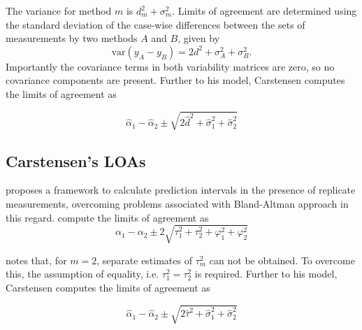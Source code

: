 \documentclass[12pt, a4paper]{report}
\theoremstyle{plain}
\theoremstyle{definition}
\theoremstyle{remark}
\begin{document}
	The variance for method $m$ is $d^2_{m}+\sigma^2_{m}$. Limits of agreement are determined using the standard deviation of the case-wise differences between the sets of measurements by two methods $A$ and $B$, given by
	\begin{equation}
	\mbox{var} (y_{A}-y_{B}) = 2d^2 + \sigma^2_{A}+ \sigma^2_{B}.
	\end{equation}
	Importantly the covariance terms in both variability matrices are zero, so no covariance components are present. Further to his model, Carstensen computes the limits of agreement
	as
	
	\[
	\hat{\alpha}_1 - \hat{\alpha}_2 \pm \sqrt{2 \hat{d}^2 + 	\hat{\sigma}^2_1 + \hat{\sigma}^2_2}
	\]
	
	
	
	
	
	
	\subsection{Carstensen's LOAs}
	\citet{BXC2008} proposes a framework to calculate prediction intervals in the presence of replicate measurements, overcoming problems associated with Bland-Altman approach in this regard. \citet{BXC2008} compute the limits of agreement as
	\[
	\alpha_1 - \alpha_2 \pm 2 \sqrt{ \tau^2_1 +  \tau^2_2 +  \varphi^2_1 +  \varphi^2_2 }
	\]
	
	\citet{BXC2008} notes that, for $m=2$, separate estimates of $\tau^2_m$ can not be obtained. To overcome this, the assumption of equality, i.e. $\tau^2_1 = \tau^2_2$ is required. Further to his model, Carstensen computes the limits of agreement
	as
	
	\[
	\hat{\alpha}_1 - \hat{\alpha}_2 \pm \sqrt{2 \hat{\tau}^2 +
		\hat{\sigma}^2_1 + \hat{\sigma}^2_2}
	\]
	
	
	
	
	
	
	
\end{document}
